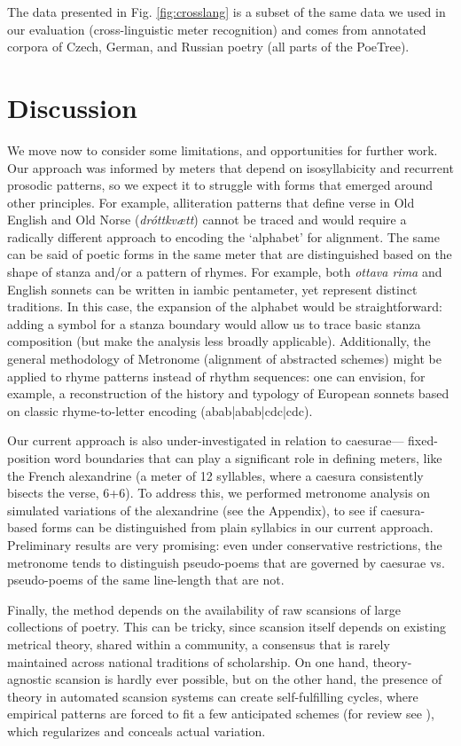 \documentclass[
    hf
]{ceurart}
\begin{document}
The data presented in Fig. \ref{fig:crosslang} is a subset of the same data we used in our evaluation (cross-linguistic meter recognition) and comes from annotated corpora of Czech, German, and Russian poetry (all parts of the PoeTree).

\section{Discussion}

We move now to consider some limitations, and opportunities for further work. Our approach was informed by meters that depend on isosyllabicity and recurrent prosodic patterns, so we expect it to struggle with forms that emerged around other principles. For example, alliteration patterns that define verse in Old English and Old Norse (\textit{dróttkvætt}) cannot be traced and would require a radically different approach to encoding the `alphabet' for alignment. The same can be said of poetic forms in the same meter that are distinguished based on the shape of stanza and/or a pattern of rhymes. For example, both \textit{ottava rima} and English sonnets can be written in iambic pentameter, yet represent distinct traditions. In this case, the expansion of the alphabet would be straightforward: adding a symbol for a stanza boundary would allow us to trace basic stanza composition (but make the analysis less broadly applicable). Additionally, the general methodology of Metronome (alignment of abstracted schemes) might be applied to rhyme patterns instead of rhythm sequences: one can envision, for example, a reconstruction of the history and typology of European sonnets based on classic rhyme-to-letter encoding (abab|abab|cdc|cdc).

Our current approach is also under-investigated in relation to caesurae--- fixed-position word boundaries that can play a significant role in defining meters, like the French alexandrine (a meter of 12 syllables, where a caesura consistently bisects the verse, 6+6). To address this, we performed metronome analysis on simulated variations of the alexandrine (see the Appendix), to see if caesura-based forms can be distinguished from plain syllabics in our current approach. Preliminary results are very promising: even under conservative restrictions, the metronome tends to distinguish pseudo-poems that are governed by caesurae vs. pseudo-poems of the same line-length that are not.

Finally, the method depends on the availability of raw scansions of large collections of poetry. This can be tricky, since scansion itself depends on existing metrical theory, shared within a community, a consensus that is rarely maintained across national traditions of scholarship. On one hand, theory-agnostic scansion is hardly ever possible, but on the other hand, the presence of theory in automated scansion systems can create self-fulfilling cycles, where empirical patterns are forced to fit a few anticipated schemes (for review see \cite{de_sisto_understanding_2024}), which regularizes and conceals actual variation.
\end{document}

